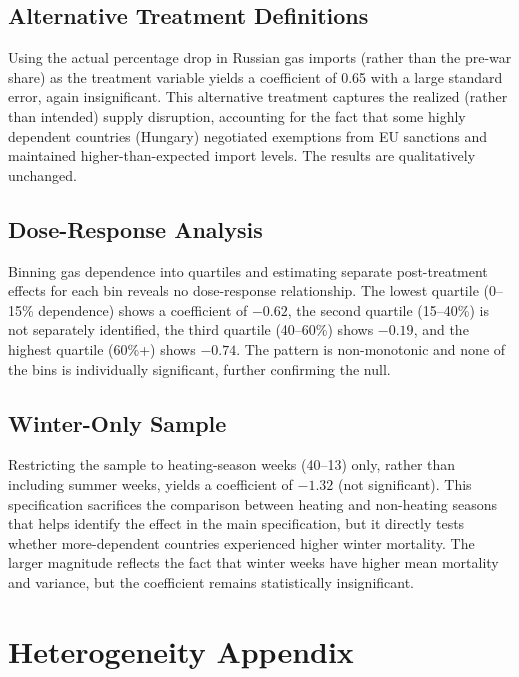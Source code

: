 \documentclass[12pt]{article}
\begin{document}
\subsection{Alternative Treatment Definitions}

Using the actual percentage drop in Russian gas imports (rather than the pre-war share) as the treatment variable yields a coefficient of 0.65 with a large standard error, again insignificant. This alternative treatment captures the realized (rather than intended) supply disruption, accounting for the fact that some highly dependent countries (Hungary) negotiated exemptions from EU sanctions and maintained higher-than-expected import levels. The results are qualitatively unchanged.

\subsection{Dose-Response Analysis}

Binning gas dependence into quartiles and estimating separate post-treatment effects for each bin reveals no dose-response relationship. The lowest quartile (0--15\% dependence) shows a coefficient of $-0.62$, the second quartile (15--40\%) is not separately identified, the third quartile (40--60\%) shows $-0.19$, and the highest quartile (60\%+) shows $-0.74$. The pattern is non-monotonic and none of the bins is individually significant, further confirming the null.

\subsection{Winter-Only Sample}

Restricting the sample to heating-season weeks (40--13) only, rather than including summer weeks, yields a coefficient of $-1.32$ (not significant). This specification sacrifices the comparison between heating and non-heating seasons that helps identify the effect in the main specification, but it directly tests whether more-dependent countries experienced higher winter mortality. The larger magnitude reflects the fact that winter weeks have higher mean mortality and variance, but the coefficient remains statistically insignificant.


\section{Heterogeneity Appendix}
\label{sec:app_het}
\end{document}
